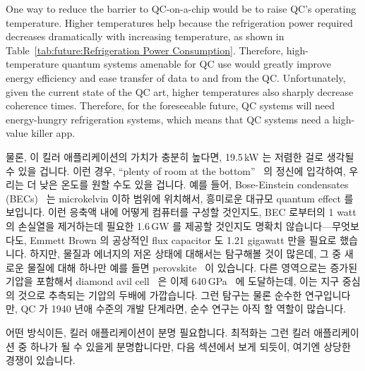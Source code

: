 One way to reduce the barrier to QC-on-a-chip would be to raise
QC's operating temperature.
Higher temperatures help because the refrigeration power required
decreases dramatically with increasing temperature, as shown in
Table~\ref{tab:future:Refrigeration Power Consumption}.
Therefore, high-temperature quantum systems amenable for QC use would
greatly improve energy efficiency and ease transfer of data to and from
the QC.
Unfortunately, given the current state of the QC art, higher
temperatures also sharply decrease coherence times.
Therefore, for the foreseeable future, QC systems will need
energy-hungry refrigeration systems, which means that QC
systems need a high-value killer app.
\fi

물론, 이 킬러 애플리케이션의 가치가 충분히 높다면, 19.5\,kW 는 저렴한 걸로
생각될 수 있을 겁니다.
이런 경우,
``plenty of room at the bottom''~\cite{RichardPFeynman1959RoomAtBottom} 의
정신에 입각하여, 우리는 더 낮은 온도를 원할 수도 있을 겁니다.
예를 들어, Bose-Einstein condensates
(BECs)~\cite{NIST2001BoseEinsteinCondensate} 는 microkelvin 이하 범위에
위치해서, 흥미로운 대규모 quantum effect 를 보입니다.
이런 응축액 내에 어떻게 컴퓨터를 구성할 것인지도, BEC 로부터의 1 watt 의
손실열을 제거하는데 필요한 1.6\,GW 를 제공할 것인지도 명확치
않습니다---무엇보다도, Emmett Brown 의 공상적인 flux capacitor 도 1.21 gigawatt
만을 필요로 했습니다.
하지만, 물질과 에너지의 저온 상태에 대해서는 탐구해볼 것이 많은데, 그 중 새로운
물질에 대해 하나만 예를 들면
perovskite~\cite{ZhengChen2016PerovskiteQDMOFthinFilm} 이 있습니다.
다른 영역으로는 증가된 기압을 포함해서 diamond avil
cell~\cite{Weir1959DiamondAnvilCell} 은 이제
640\,GPa~\cite{LeonidDubrovinsky2012640GPaDiamondAnvilCell} 에 도달하는데, 이는
지구 중심의 것으로 추측되는 기압의 두배에 가깝습니다.
그런 탐구는 물론 순수한 연구입니다만, QC 가 1940 년애 수준의 개발 단계라면,
순수 연구는 아직 할 역할이 많습니다.

어떤 방식이든, 킬러 애플리케이션이 분명 필요합니다.
최적화는 그런 킬러 애플리케이션 중 하나가 될 수 있을게 분명합니다만, 다음
섹션에서 보게 되듯이, 여기엔 상당한 경쟁이 있습니다.
\iffalse

